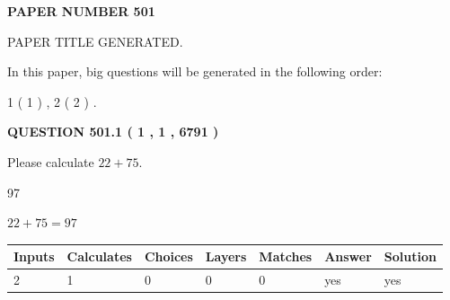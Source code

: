 \documentclass[12pt]{article}
\begin{document}
   
 {\textbf{ \Large{ PAPER NUMBER  501  }}}
   
   
\vspace{0.2in}
   
   
   
   
   
   
   
   
 \vspace{0.2in}
 
 
 
 
   
   
 PAPER TITLE GENERATED.
   
   
   
\vspace{0.2in}
   
In this paper, big questions will be generated in the following order: 
   
   
   1 ( 1 )
 ,
   2 ( 2 )
 .
  
\vspace{0.2in}
  
{\textbf{\Large{QUESTION
501.1 
 ( 1 , 1 , 6791 )
}}}
  
  
 
Please calculate $ %
22 +  %
75 $.
 
 
 
\noindent{}
 
 

97
 
 
\noindent{}
 
 

 
 
 
\noindent{}
 
 

$ %
22 +  %
75=   %
97$
 
 
\noindent{}
 
 

 
   
   
   
   
\noindent\begin{tabular}{|l|l|l|l|l|l|l|}
 \hline
Inputs & Calculates & Choices & Layers & Matches & Answer & Solution \\ \hline
 2  & 
 1  & 
 0
  & 
 0  & 
 0  & 
  yes & 
  yes 
  \\ \hline
 \end{tabular}
   
\end{document}
